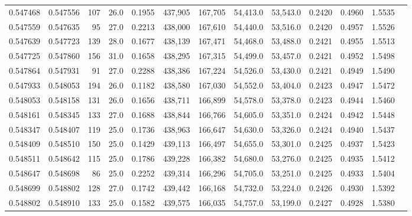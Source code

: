 \begin{tabular}{rrrrrrrrrrrrr}
0.547468 & 0.547556 &   107 & 26.0 &                                     0.1955 & 437,905 & 167,705 &  54,413.0 &  53,543.0 & 0.2420 & 0.4960 & 1.5535 \\
0.547559 & 0.547635 &    95 & 27.0 &                                     0.2213 & 438,000 & 167,610 &  54,440.0 &  53,516.0 & 0.2420 & 0.4957 & 1.5526 \\
0.547639 & 0.547723 &   139 & 28.0 &                                     0.1677 & 438,139 & 167,471 &  54,468.0 &  53,488.0 & 0.2421 & 0.4955 & 1.5513 \\
0.547725 & 0.547860 &   156 & 31.0 &                                     0.1658 & 438,295 & 167,315 &  54,499.0 &  53,457.0 & 0.2421 & 0.4952 & 1.5498 \\
0.547864 & 0.547931 &    91 & 27.0 &                                     0.2288 & 438,386 & 167,224 &  54,526.0 &  53,430.0 & 0.2421 & 0.4949 & 1.5490 \\
0.547933 & 0.548053 &   194 & 26.0 &                                     0.1182 & 438,580 & 167,030 &  54,552.0 &  53,404.0 & 0.2423 & 0.4947 & 1.5472 \\
0.548053 & 0.548158 &   131 & 26.0 &                                     0.1656 & 438,711 & 166,899 &  54,578.0 &  53,378.0 & 0.2423 & 0.4944 & 1.5460 \\
0.548161 & 0.548345 &   133 & 27.0 &                                     0.1688 & 438,844 & 166,766 &  54,605.0 &  53,351.0 & 0.2424 & 0.4942 & 1.5448 \\
0.548347 & 0.548407 &   119 & 25.0 &                                     0.1736 & 438,963 & 166,647 &  54,630.0 &  53,326.0 & 0.2424 & 0.4940 & 1.5437 \\
0.548409 & 0.548510 &   150 & 25.0 &                                     0.1429 & 439,113 & 166,497 &  54,655.0 &  53,301.0 & 0.2425 & 0.4937 & 1.5423 \\
0.548511 & 0.548642 &   115 & 25.0 &                                     0.1786 & 439,228 & 166,382 &  54,680.0 &  53,276.0 & 0.2425 & 0.4935 & 1.5412 \\
0.548647 & 0.548698 &    86 & 25.0 &                                     0.2252 & 439,314 & 166,296 &  54,705.0 &  53,251.0 & 0.2425 & 0.4933 & 1.5404 \\
0.548699 & 0.548802 &   128 & 27.0 &                                     0.1742 & 439,442 & 166,168 &  54,732.0 &  53,224.0 & 0.2426 & 0.4930 & 1.5392 \\
0.548802 & 0.548910 &   133 & 25.0 &                                     0.1582 & 439,575 & 166,035 &  54,757.0 &  53,199.0 & 0.2427 & 0.4928 & 1.5380 \\

\end{tabular}
